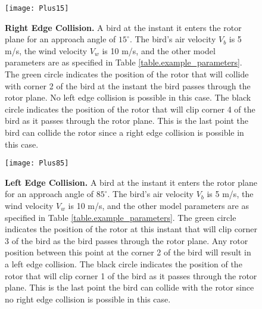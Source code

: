 \documentclass[10pt,conference]{IEEEtran}
\begin{document}
\begin{figure}
   \centering
   \texttt{[image: Plus15]}
   \caption{\textbf{Right Edge Collision.} A bird at the instant it enters the rotor plane for an approach angle of $15^\circ$. The bird's air velocity $V_b$ is 5
m/s, the wind velocity $V_w$ is 10 m/s, and the other model parameters are as specified in Table
\ref{table.example_parameters}. The green circle indicates the position of the rotor that will collide with corner 2 of
the bird at the instant the bird passes through the rotor plane. No left edge collision is possible in this case. The
black circle indicates the position of the rotor that will clip corner 4 of the bird as it passes through the rotor
plane. This is the last point the bird can collide the rotor since a right edge collision is possible in this case.}
   \label{fig.Plus15}
   \end{figure}


\begin{figure}
   \centering
   \texttt{[image: Plus85]}
   \caption{\textbf{Left Edge Collision.} A bird at the instant it enters the rotor plane for an approach angle of $85^\circ$. The bird's air velocity $V_b$ is 5
m/s, the wind velocity $V_w$ is 10 m/s, and the other model parameters are as specified in Table
\ref{table.example_parameters}. The green circle indicates the position of the rotor at this instant that will clip
corner 3 of the bird as the bird passes through the rotor plane. Any rotor position between this point at the corner 2
of the bird will result in a left edge collision. The black circle indicates the position of the rotor that will clip
corner 1 of the bird as it passes through the rotor plane. This is the last point the bird can collide with the rotor
since no right edge collision is possible in this case.}
   \label{fig.Plus85}
   \end{figure}
\end{document}
